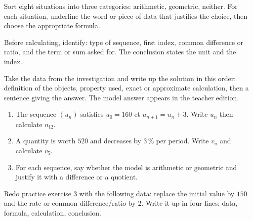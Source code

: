 \begin{activite}
Sort eight situations into three categories: arithmetic, geometric, neither. For each situation, underline the word or piece of data that justifies the choice, then choose the appropriate formula.

\end{activite}

\begin{traceecrite}Before calculating, identify: type of sequence, first index, common difference or ratio, and the term or sum asked for. The conclusion states the unit and the index.\end{traceecrite}

\begin{exemple}
Take the data from the investigation and write up the solution in this order: definition of the objects, property used, exact or approximate calculation, then a sentence giving the answer. The model answer appears in the teacher edition.
\end{exemple}

\begin{exercice}[-- essential]
\begin{enumerate}\item The sequence $(u_n)$ satisfies $u_0=160$ et $u_{n+1}=u_n+3$. Write $u_n$ then calculate $u_{12}$.\item A quantity is worth $520$ and decreases by $3\,\%$ per period. Write $v_n$ and calculate $v_5$.\item For each sequence, say whether the model is arithmetic or geometric and justify it with a difference or a quotient.\end{enumerate}
\end{exercice}


\begin{dm}Redo practice exercise 3 with the following data: replace the initial value by $150$ and the rate or common difference/ratio by $2$. Write it up in four lines: data, formula, calculation, conclusion.\end{dm}


